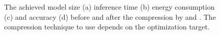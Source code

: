 \begin{figure}[!t]
\centering
{}
\hfill


\caption{The achieved model size (a) inference time (b) energy consumption (c) and accuracy (d) before and after the compression by \quantization and \pruning.
The compression technique to use depends on the optimization target.}
\label{fig:motivation}
\end{figure}
